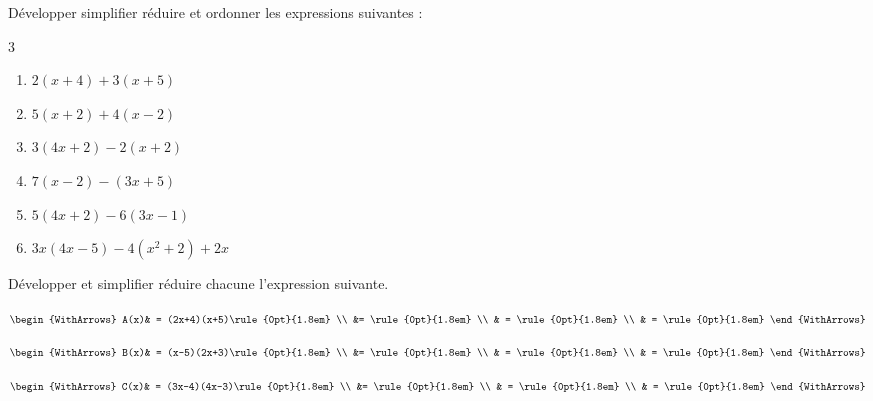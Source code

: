 \documentclass[main.tex]{subfiles}
\begin{document}
\begin{exercise} \label{chap07:exo:simple2} Développer simplifier réduire et ordonner les expressions suivantes :
	\vspace{-0.5em}
	\begin{multicols}{3}
		\begin{enumerate}[label={$\Alph*=$},leftmargin=*]
			\item $2\left(x+4\right)+3\left(x+5\right)$
			\item $5\left(x+2\right)+4\left(x-2\right)$
			\item $3\left(4x+2\right)-2\left(x+2\right)$
			\item $7\left(x-2\right)-\left(3x+5\right)$
			\item $5\left(4x+2\right)-6\left(3x-1\right)$
			\item $3x\left(4x-5\right)-4\left(x^2+2\right)+2x$
		\end{enumerate}
	\end{multicols} 
\end{exercise}
\begin{example} Développer et simplifier réduire chacune l'expression suivante.
	
	\noindent\parbox{0.31\linewidth}{	
		$\begin{WithArrows}
			A(x)& = (2x+4)(x+5)\rule{0pt}{1.8em}  \\
			&=  \rule{0pt}{1.8em}  \\
			& =   \rule{0pt}{1.8em}  \\
			& =  \rule{0pt}{1.8em}   
		\end{WithArrows}$ 	
	} 
	\hfill 
	\parbox{0.31\linewidth}{	
		$\begin{WithArrows}
			B(x)& = (x-5)(2x+3)\rule{0pt}{1.8em}  \\
			&= \rule{0pt}{1.8em}  \\
			& =  \rule{0pt}{1.8em}  \\
			& =  \rule{0pt}{1.8em}    
		\end{WithArrows}$ 	
	}  \hfill  \parbox{0.31\linewidth}{	
		$\begin{WithArrows}
			C(x)& = (3x-4)(4x-3)\rule{0pt}{1.8em}  \\
			&= \rule{0pt}{1.8em}  \\
			& =  \rule{0pt}{1.8em}  \\
			& =  \rule{0pt}{1.8em}   
		\end{WithArrows}$ 	
	}  
\end{example}
\end{document}
